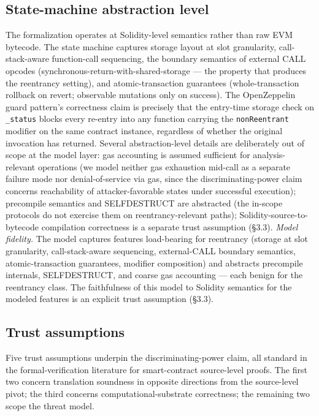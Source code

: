 \subsection{State-machine abstraction
level}\label{state-machine-abstraction-level}

The formalization operates at Solidity-level semantics rather than raw
EVM bytecode. The state machine captures storage layout at slot
granularity, call-stack-aware function-call sequencing, the boundary
semantics of external CALL opcodes
(synchronous-return-with-shared-storage --- the property that produces
the reentrancy setting), and atomic-transaction guarantees
(whole-transaction rollback on revert; observable mutations only on
success). The OpenZeppelin guard pattern's correctness claim is
precisely that the entry-time storage check on \texttt{\_status} blocks
every re-entry into any function carrying the \texttt{nonReentrant}
modifier on the same contract instance, regardless of whether the
original invocation has returned. Several abstraction-level details are
deliberately out of scope at the model layer: gas accounting is assumed
sufficient for analysis-relevant operations (we model neither gas
exhaustion mid-call as a separate failure mode nor denial-of-service via
gas, since the discriminating-power claim concerns reachability of
attacker-favorable states under successful execution); precompile
semantics and SELFDESTRUCT are abstracted (the in-scope protocols do not
exercise them on reentrancy-relevant paths); Solidity-source-to-bytecode
compilation correctness is a separate trust assumption (§3.3).
\emph{Model fidelity.} The model captures features load-bearing for
reentrancy (storage at slot granularity, call-stack-aware sequencing,
external-CALL boundary semantics, atomic-transaction guarantees,
modifier composition) and abstracts precompile internals, SELFDESTRUCT,
and coarse gas accounting --- each benign for the reentrancy class. The
faithfulness of this model to Solidity semantics for the modeled
features is an explicit trust assumption (§3.3).

\subsection{Trust assumptions}\label{trust-assumptions}

Five trust assumptions underpin the discriminating-power claim, all
standard in the formal-verification literature for smart-contract
source-level proofs. The first two concern translation soundness in
opposite directions from the source-level pivot; the third concerns
computational-substrate correctness; the remaining two scope the threat
model.

